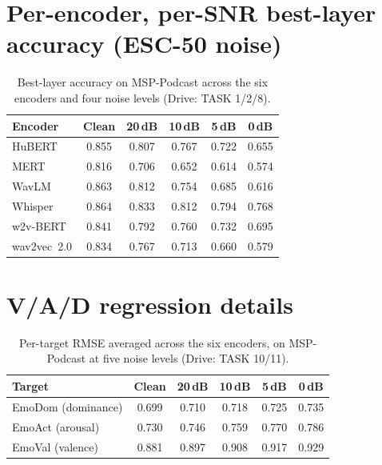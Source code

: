 \documentclass[sigconf,screen]{acmart}
\begin{document}
\section{Per-encoder, per-SNR best-layer accuracy (ESC-50 noise)}
\label{app:noise-full}
\begin{table}[h]
\centering
\small
\caption{Best-layer accuracy on MSP-Podcast across the six encoders and four noise levels (Drive: TASK 1/2/8).}
\label{tab:noise-full}
\setlength{\tabcolsep}{4.5pt}
\begin{tabular}{lccccc}
\toprule
\textbf{Encoder} & \textbf{Clean} & \textbf{20\,dB} & \textbf{10\,dB} & \textbf{5\,dB} & \textbf{0\,dB} \\
\midrule
HuBERT       & 0.855 & 0.807 & 0.767 & 0.722 & 0.655 \\
MERT         & 0.816 & 0.706 & 0.652 & 0.614 & 0.574 \\
WavLM        & 0.863 & 0.812 & 0.754 & 0.685 & 0.616 \\
Whisper      & 0.864 & 0.833 & 0.812 & 0.794 & 0.768 \\
w2v-BERT     & 0.841 & 0.792 & 0.760 & 0.732 & 0.695 \\
wav2vec~2.0  & 0.834 & 0.767 & 0.713 & 0.660 & 0.579 \\
\bottomrule
\end{tabular}
\end{table}
\section{V/A/D regression details}
\label{app:vad-full}
\begin{table}[h]
\centering
\small
\caption{Per-target RMSE averaged across the six encoders, on MSP-Podcast at five noise levels (Drive: TASK 10/11).}
\label{tab:vad-target}
\begin{tabular}{lccccc}
\toprule
\textbf{Target} & \textbf{Clean} & \textbf{20\,dB} & \textbf{10\,dB} & \textbf{5\,dB} & \textbf{0\,dB} \\
\midrule
EmoDom (dominance) & 0.699 & 0.710 & 0.718 & 0.725 & 0.735 \\
EmoAct (arousal)   & 0.730 & 0.746 & 0.759 & 0.770 & 0.786 \\
EmoVal (valence)   & 0.881 & 0.897 & 0.908 & 0.917 & 0.929 \\
\bottomrule
\end{tabular}
\end{table}
\end{document}
